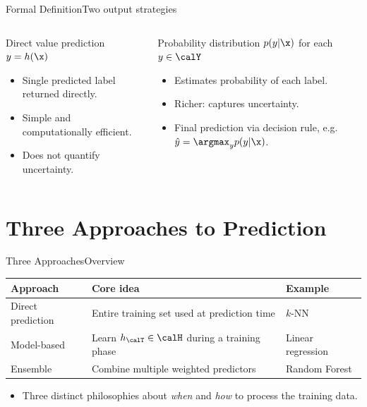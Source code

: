 \begin{frame}{Formal Definition}{Two output strategies}
  \begin{columns}[T]
    \begin{block}{Direct value prediction}
      $y = h(\x)$
      \begin{itemize}
        \item Single predicted label returned directly.
        \item Simple and computationally efficient.
        \item Does not quantify uncertainty.
      \end{itemize}
    \end{block}
    \begin{block}{Probability distribution}
      $p(y|\x)$ for each $y \in \calY$
      \begin{itemize}
        \item Estimates probability of each label.
        \item Richer: captures uncertainty.
        \item Final prediction via decision rule, e.g.\ $\hat y = \argmax_y p(y|\x)$.
      \end{itemize}
    \end{block}
  \end{columns}
\end{frame}

\section{Three Approaches to Prediction}

\begin{frame}{Three Approaches}{Overview}
  \begin{table}
    \centering
    \begin{tabular}{lll}
      \toprule
      \textbf{Approach} & \textbf{Core idea} & \textbf{Example}\\
      \midrule
      Direct prediction & Entire training set used at prediction time & $k$-NN\\
      Model-based       & Learn $h_\calT \in \calH$ during a training phase & Linear regression\\
      Ensemble          & Combine multiple weighted predictors & Random Forest\\
      \bottomrule
    \end{tabular}
  \end{table}
  \bigskip
  \begin{itemize}
    \item Three distinct philosophies about \emph{when} and \emph{how} to process the
          training data.
  \end{itemize}
\end{frame}

